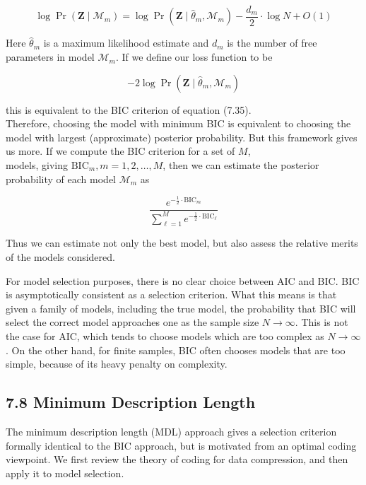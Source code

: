 \documentclass[10pt]{article}
\begin{document}
\begin{equation*}
\log \operatorname{Pr}\left(\mathbf{Z} \mid \mathcal{M}_{m}\right)=\log \operatorname{Pr}\left(\mathbf{Z} \mid \hat{\theta}_{m}, \mathcal{M}_{m}\right)-\frac{d_{m}}{2} \cdot \log N+O(1) \tag{7.40}
\end{equation*}


Here $\hat{\theta}_{m}$ is a maximum likelihood estimate and $d_{m}$ is the number of free parameters in model $\mathcal{M}_{m}$. If we define our loss function to be

$$
-2 \log \operatorname{Pr}\left(\mathbf{Z} \mid \hat{\theta}_{m}, \mathcal{M}_{m}\right)
$$

this is equivalent to the BIC criterion of equation (7.35).\\
Therefore, choosing the model with minimum BIC is equivalent to choosing the model with largest (approximate) posterior probability. But this framework gives us more. If we compute the BIC criterion for a set of $M$,\\
models, giving $\mathrm{BIC}_{m}, m=1,2, \ldots, M$, then we can estimate the posterior probability of each model $\mathcal{M}_{m}$ as


\begin{equation*}
\frac{e^{-\frac{1}{2} \cdot \mathrm{BIC}_{m}}}{\sum_{\ell=1}^{M} e^{-\frac{1}{2} \cdot \mathrm{BIC}_{\ell}}} \tag{7.41}
\end{equation*}


Thus we can estimate not only the best model, but also assess the relative merits of the models considered.

For model selection purposes, there is no clear choice between AIC and BIC. BIC is asymptotically consistent as a selection criterion. What this means is that given a family of models, including the true model, the probability that BIC will select the correct model approaches one as the sample size $N \rightarrow \infty$. This is not the case for AIC, which tends to choose models which are too complex as $N \rightarrow \infty$. On the other hand, for finite samples, BIC often chooses models that are too simple, because of its heavy penalty on complexity.

\subsection*{7.8 Minimum Description Length}
The minimum description length (MDL) approach gives a selection criterion formally identical to the BIC approach, but is motivated from an optimal coding viewpoint. We first review the theory of coding for data compression, and then apply it to model selection.
\end{document}
